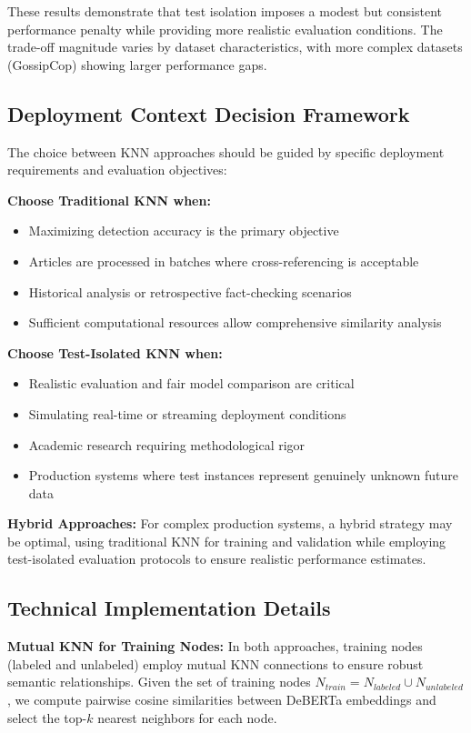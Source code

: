 These results demonstrate that test isolation imposes a modest but consistent performance penalty while providing more realistic evaluation conditions. The trade-off magnitude varies by dataset characteristics, with more complex datasets (GossipCop) showing larger performance gaps.

\subsection{Deployment Context Decision Framework}

The choice between KNN approaches should be guided by specific deployment requirements and evaluation objectives:

\textbf{Choose Traditional KNN when:}
\begin{itemize}
    \item Maximizing detection accuracy is the primary objective
    \item Articles are processed in batches where cross-referencing is acceptable
    \item Historical analysis or retrospective fact-checking scenarios
    \item Sufficient computational resources allow comprehensive similarity analysis
\end{itemize}

\textbf{Choose Test-Isolated KNN when:}
\begin{itemize}
    \item Realistic evaluation and fair model comparison are critical
    \item Simulating real-time or streaming deployment conditions
    \item Academic research requiring methodological rigor
    \item Production systems where test instances represent genuinely unknown future data
\end{itemize}

\textbf{Hybrid Approaches:} For complex production systems, a hybrid strategy may be optimal, using traditional KNN for training and validation while employing test-isolated evaluation protocols to ensure realistic performance estimates.

\subsection{Technical Implementation Details}

\textbf{Mutual KNN for Training Nodes:} In both approaches, training nodes (labeled and unlabeled) employ mutual KNN connections to ensure robust semantic relationships. Given the set of training nodes $N_{train} = N_{labeled} \cup N_{unlabeled}$, we compute pairwise cosine similarities between DeBERTa embeddings and select the top-$k$ nearest neighbors for each node.

